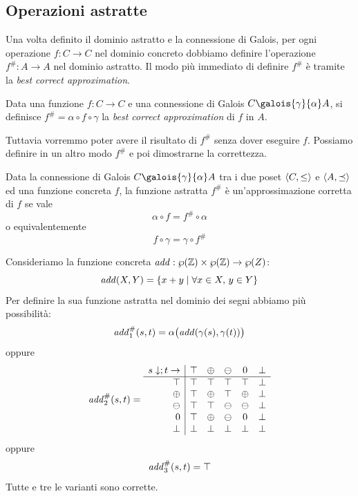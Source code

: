 \subsection{Operazioni astratte}

Una volta definito il dominio astratto e la connessione di Galois, per ogni operazione $f : C \to C$ nel dominio concreto dobbiamo definire l'operazione $f^{\#} : A \to A$ nel dominio astratto. Il modo più immediato di definire $f^{\#}$ è tramite la \emph{best correct approximation}.

\begin{definition}
Data una funzione $f : C \to C$ e una connessione di Galois $C \galois{\gamma}{\alpha} A$, si definisce $f^{\#} = \alpha \circ f \circ \gamma$ la \emph{best correct approximation} di $f$ in $A$.
\end{definition}

Tuttavia vorremmo poter avere il risultato di $f^{\#}$ senza dover eseguire $f$. Possiamo definire in un altro modo $f^{\#}$ e poi dimostrarne la correttezza.

\begin{definition}
Data la connessione di Galois $C \galois{\gamma}{\alpha} A$ tra i due poset $\langle C, \le \rangle$ e $\langle A, \preceq \rangle$ ed una funzione concreta $f$, la funzione astratta $f^{\#}$ è un'approssimazione corretta di $f$ se vale
\[ \alpha \circ f = f^{\#} \circ \alpha \]
o equivalentemente
\[ f \circ \gamma = \gamma \circ f^{\#} \]
\end{definition}

\begin{example}
Consideriamo la funzione concreta $\mathit{add} : \wp(\mathbb{Z}) \times \wp(\mathbb{Z}) \to \wp(Z)$:
\[ \mathit{add}(X, Y) = \{ x + y \mid \forall x \in X, \, y \in Y \} \]
Per definire la sua funzione astratta nel dominio dei segni abbiamo più possibilità:
\[ \mathit{add}^{\#}_1(s, t) = \alpha\big(\mathit{add}(\gamma(s), \gamma(t)) \big) \]
oppure
\[ \mathit{add}^{\#}_2(s,t) = \begin{array}{r|ccccc}
    s \downarrow; t \rightarrow & \top & \oplus & \ominus & 0       & \bot  \\\hline
    \top                      & \top   & \top   & \top    & \top    & \bot  \\
    \oplus                    & \top   & \oplus & \top    & \oplus  & \bot  \\
    \ominus                   & \top   & \top   & \ominus & \ominus & \bot  \\
    0                         & \top   & \oplus & \ominus & 0       & \bot  \\
    \bot                      & \bot   & \bot   & \bot    & \bot    & \bot  \\
\end{array} \]
oppure 
\[ \mathit{add}^{\#}_3(s,t) = \top \]
Tutte e tre le varianti sono corrette. 
\end{example}










